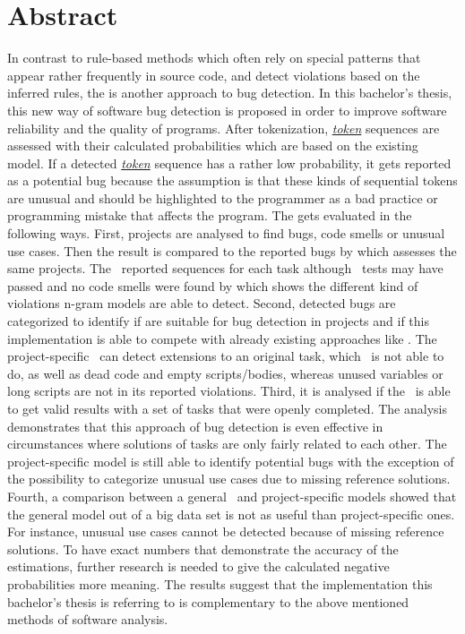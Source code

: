 \chapter*{Abstract}

In contrast to rule-based methods which often rely on special patterns that appear rather frequently in source code, and detect violations based on the inferred rules, the \ngram{} is another approach to bug detection. In this bachelor's thesis, this new way of software bug detection is proposed in order to improve software reliability and the quality of \scratch{} programs. After tokenization, \hyperref[def:token]{\textit{token}} sequences are assessed with their calculated probabilities which are based on the existing model. If a detected \hyperref[def:token]{\textit{token}} sequence has a rather low probability, it gets reported as a potential bug because the assumption is that these kinds of sequential tokens are unusual and should be highlighted to the programmer as a bad practice or programming mistake that affects the program. The \ngram{} gets evaluated in the following ways. First, \scratch{} projects are analysed to find bugs, code smells or unusual use cases. Then the result is compared to the reported bugs by \litterbox{} which assesses the same projects. The \ngram\ reported sequences for each task although \whisker\ tests may have passed and no code smells were found by \litterbox{} which shows the different kind of violations n-gram models are able to detect. Second, detected bugs are categorized to identify if  are suitable for bug detection in \scratch{} projects and if this implementation is able to compete with already existing approaches like \litterbox{}. The project-specific \ngram\ can detect extensions to an original task, which \litterbox\ is not able to do, as well as dead code and empty scripts/bodies, whereas unused variables or long scripts are not in its reported violations. Third, it is analysed if the \ngram\ is able to get valid results with a set of tasks that were openly completed. The analysis demonstrates that this approach of bug detection is even effective in circumstances where solutions of tasks are only fairly related to each other. The project-specific model is still able to identify potential bugs with the exception of the possibility to categorize unusual use cases due to missing reference solutions. Fourth, a comparison between a general \ngram\ and project-specific models showed that the general model out of a big data set is not as useful than project-specific ones. For instance, unusual use cases cannot be detected because of missing reference solutions. To have exact numbers that demonstrate the accuracy of the estimations, further research is needed to give the calculated negative probabilities more meaning. The results suggest that the implementation this bachelor's thesis is referring to is complementary to the above mentioned methods of software analysis.

